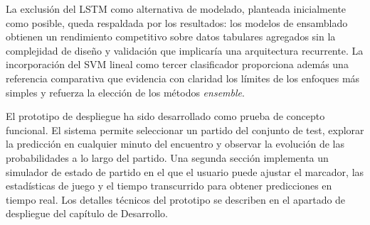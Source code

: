 La exclusión del LSTM como alternativa de modelado, planteada inicialmente como posible, queda respaldada por los resultados: los modelos de ensamblado obtienen un rendimiento competitivo sobre datos tabulares agregados sin la complejidad de diseño y validación que implicaría una arquitectura recurrente. La incorporación del SVM lineal como tercer clasificador proporciona además una referencia comparativa que evidencia con claridad los límites de los enfoques más simples y refuerza la elección de los métodos \textit{ensemble}.

El prototipo de despliegue ha sido desarrollado como prueba de concepto funcional. El sistema permite seleccionar un partido del conjunto de test, explorar la predicción en cualquier minuto del encuentro y observar la evolución de las probabilidades a lo largo del partido. Una segunda sección implementa un simulador de estado de partido en el que el usuario puede ajustar el marcador, las estadísticas de juego y el tiempo transcurrido para obtener predicciones en tiempo real. Los detalles técnicos del prototipo se describen en el apartado de despliegue del capítulo de Desarrollo.